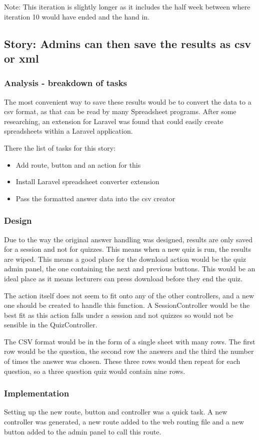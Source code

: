 Note: This iteration is slightly longer as it includes the half week between where iteration 10 would have ended and the hand in.

\subsection{Story: Admins can then save the results as csv or xml}
\subsubsection{Analysis - breakdown of tasks}
The most convenient way to save these results would be to convert the data to a csv format, as that can be read by many Spreadsheet programs. After some researching, an extension for Laravel was found that could easily create spreadsheets within a Laravel application\cite{laravel-excel}.

There the list of tasks for this story:
\begin{itemize}
	\item Add route, button and an action for this
	\item Install Laravel spreadsheet converter extension
	\item Pass the formatted answer data into the csv creator
\end{itemize}
\subsubsection{Design}
Due to the way the original answer handling was designed, results are only saved for a session and not for quizzes. This means when a new quiz is run, the results are wiped. This means a good place for the download action would be the quiz admin panel, the one containing the next and previous buttons. This would be an ideal place as it means lecturers can press download before they end the quiz.

The action itself does not seem to fit onto any of the other controllers, and a new one should be created to handle this function. A SessionController would be the best fit as this action falls under a session and not quizzes so would not be sensible in the QuizController.

The CSV format would be in the form of a single sheet with many rows. The first row would be the question, the second row the answers and the third the number of times the answer was chosen. These three rows would then repeat for each question, so a three question quiz would contain nine rows.
\subsubsection{Implementation}
Setting up the new route, button and controller was a quick task. A new controller was generated, a new route added to the web routing file and a new button added to the admin panel to call this route.


